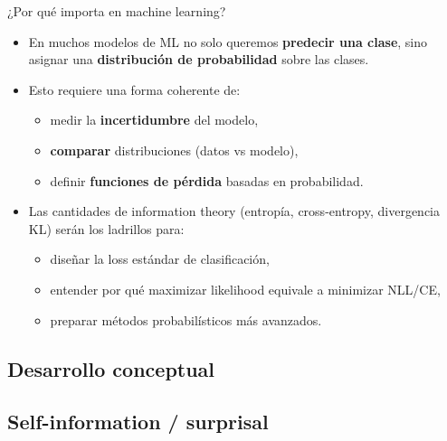 \begin{frame}{¿Por qué importa en machine learning?}
\begin{itemize}
  \item En muchos modelos de ML no solo queremos \textbf{predecir una clase}, sino asignar una \textbf{distribución de probabilidad} sobre las clases.
  \item Esto requiere una forma coherente de:
  \begin{itemize}
    \item medir la \textbf{incertidumbre} del modelo,
    \item \textbf{comparar} distribuciones (datos vs modelo),
    \item definir \textbf{funciones de pérdida} basadas en probabilidad.
  \end{itemize}
  \item Las cantidades de information theory (entropía, cross-entropy, divergencia KL) serán los ladrillos para:
  \begin{itemize}
    \item diseñar la loss estándar de clasificación,
    \item entender por qué maximizar likelihood equivale a minimizar NLL/CE,
    \item preparar métodos probabilísticos más avanzados.
  \end{itemize}
\end{itemize}
\end{frame}

\subsection[Conceptos]{Desarrollo conceptual}

\subsection{Self-information / surprisal}


